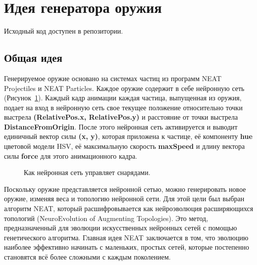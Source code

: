 ﻿%
\section{Идея генератора оружия}

Исходный код доступен в репозитории\cite{s7}.

\subsection{Общая идея}

Генерируемое оружие основано на системах частиц из программ NEAT Projectiles и
NEAT Particles\cite{s2}\cite{s3}. Каждое оружие содержит в себе нейронную сеть (Рисунок~\ref{Weapon}). Каждый кадр анимации каждая частица, выпущенная из оружия, подает на вход в нейронную сеть свое текущее положение относительно точки выстрела {\small \textbf{(RelativePos.x, RelativePos.y)}} и расстояние от точки выстрела {\small \textbf{DistanceFromOrigin}}. После этого нейронная сеть активируется и выводит единичный вектор силы {\small \textbf{(x, y)}}, которая приложена к частице, её компоненту {\small \textbf{hue}} цветовой модели HSV, её максимальную скорость {\small \textbf{maxSpeed}} и длину вектора силы {\small \textbf{force}} для этого анимационного кадра.

\begin{figure}[ht]
    \begin{center}

        \caption{
            \label{Weapon}
            Как нейронная сеть управляет снарядами.}
    \end {center}
\end {figure}

Поскольку оружие представляется нейронной сетью, можно генерировать новое оружие, изменяя веса и топологию нейронной сети. Для этой цели был выбран алгоритм NEAT\cite{s1}, который расшифровывается как нейроэволюция расширяющихся топологий (NeuroEvolution of Augmenting Topologies). Это метод, предназначенный для эволюции искусственных нейронных сетей с помощью генетического алгоритма. Главная идея NEAT заключается в том, что эволюцию наиболее эффективно начинать с маленьких, простых сетей, которые постепенно становятся всё более сложными с каждым поколением.

